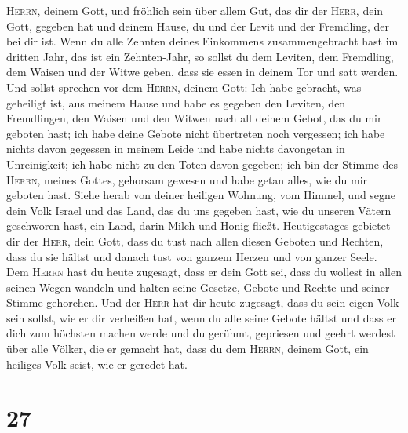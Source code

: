 \textsc{Herrn}, deinem Gott,  und fröhlich sein über
allem Gut, das dir der \textsc{Herr}, dein Gott, gegeben hat und deinem
Hause, du und der Levit und der Fremdling, der bei dir ist.
 Wenn du alle Zehnten deines Einkommens zusammengebracht
hast im dritten Jahr, das ist ein Zehnten-Jahr, so sollst du dem
Leviten, dem Fremdling, dem Waisen und der Witwe geben, dass sie essen
in deinem Tor und satt werden.  Und sollst sprechen vor
dem \textsc{Herrn}, deinem Gott: Ich habe gebracht, was geheiligt ist,
aus meinem Hause und habe es gegeben den Leviten, den Fremdlingen, den
Waisen und den Witwen nach all deinem Gebot, das du mir geboten hast;
ich habe deine Gebote nicht übertreten noch vergessen; 
ich habe nichts davon gegessen in meinem Leide und habe nichts
davongetan in Unreinigkeit; ich habe nicht zu den Toten davon gegeben;
ich bin der Stimme des \textsc{Herrn}, meines Gottes, gehorsam gewesen
und habe getan alles, wie du mir geboten hast.  Siehe
herab von deiner heiligen Wohnung, vom Himmel, und segne dein Volk
Israel und das Land, das du uns gegeben hast, wie du unseren Vätern
geschworen hast, ein Land, darin Milch und Honig fließt. 
Heutigestages gebietet dir der \textsc{Herr}, dein Gott, dass du tust
nach allen diesen Geboten und Rechten, dass du sie hältst und danach
tust von ganzem Herzen und von ganzer Seele.  Dem
\textsc{Herrn} hast du heute zugesagt, dass er dein Gott sei, dass du
wollest in allen seinen Wegen wandeln und halten seine Gesetze, Gebote
und Rechte und seiner Stimme gehorchen.  Und der
\textsc{Herr} hat dir heute zugesagt, dass du sein eigen Volk sein
sollst, wie er dir verheißen hat, wenn du alle seine Gebote hältst
 und dass er dich zum höchsten machen werde und du
gerühmt, gepriesen und geehrt werdest über alle Völker, die er gemacht
hat, dass du dem \textsc{Herrn}, deinem Gott, ein heiliges Volk seist,
wie er geredet hat.

\hypertarget{section-26}{%
\section{27}\label{section-26}}

